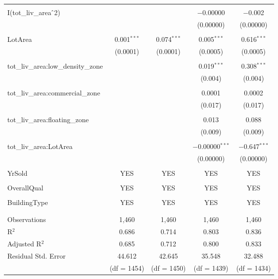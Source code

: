 \documentclass[a4paper]{article}
\begin{document}
\begin{table}[!htbp]
\begin{adjustwidth}{-0.0cm}{-0cm}
\begin{threeparttable}
\begin{tabular}{@{\extracolsep{1pt}}lcccc}
  & & & & \\ 
 I(tot\_liv\_area$\hat{\mkern6mu}$2) &  &  & $-$0.00000 & $-$0.002 \\ 
  &  &  & (0.00000) & (0.00000) \\ 
  & & & & \\ 
 LotArea & 0.001$^{***}$ & 0.074$^{***}$ & 0.005$^{***}$ & 0.616$^{***}$ \\ 
  & (0.0001) & (0.0001) & (0.0005) & (0.0005) \\ 
  & & & & \\ 
 tot\_liv\_area:low\_density\_zone &  &  & 0.019$^{***}$ & 0.308$^{***}$ \\ 
  &  &  & (0.004) & (0.004) \\ 
  & & & & \\ 
 tot\_liv\_area:commercial\_zone &  &  & 0.0001 & 0.0002 \\ 
  &  &  & (0.017) & (0.017) \\ 
  & & & & \\ 
 tot\_liv\_area:floating\_zone &  &  & 0.013 & 0.088 \\ 
  &  &  & (0.009) & (0.009) \\ 
  & & & & \\ 
 tot\_liv\_area:LotArea &  &  & $-$0.00000$^{***}$ & $-$0.647$^{***}$ \\ 
  &  &  & (0.00000) & (0.00000) \\ 
  & & & & \\ 
 YrSold & YES & YES & YES & YES \\ 
  & & & & \\ 
 OverallQual & YES & YES & YES & YES \\  
 & & & & \\ 
 BuildingType & YES & YES & YES & YES \\ 
 & & & & \\ 
\hline \\[-1.8ex] 
Observations & 1,460 & 1,460 & 1,460 & 1,460 \\ 
R$^{2}$ & 0.686 & 0.714 & 0.803 & 0.836 \\ 
Adjusted R$^{2}$ & 0.685 & 0.712 & 0.800 & 0.833 \\ 
Residual Std. Error & 44.612 & 42.645 & 35.548 & 32.488 \\ 
& (df = 1454) & (df = 1450) & (df = 1439) & (df = 1434)\\

\end{tabular}
\end{threeparttable}
\end{adjustwidth}
\end{table}
\end{document}

